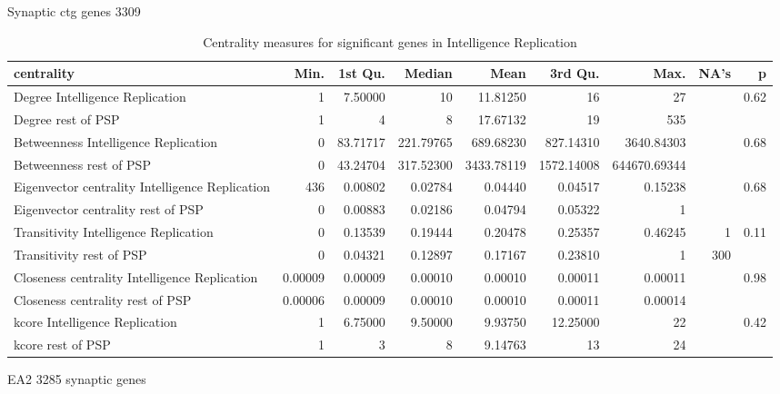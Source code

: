 Synaptic ctg genes  3309%
\begin{table}[ht]
\centering
\begin{adjustbox}{width=\textwidth}

\begin{tabular}{lrrrrrrrr}
  \hline
centrality & Min. & 1st Qu. & Median & Mean & 3rd Qu. & Max. & NA's & p \\ 
  \hline
Degree Intelligence Replication & 1  & 7.50000 & 10  & 11.81250 & 16  & 27  &  & 0.62 \\ 
  Degree rest of PSP & 1  & 4  & 8  & 17.67132 & 19  & 535  &  &  \\ 
  Betweenness Intelligence Replication & 0  & 83.71717 & 221.79765 & 689.68230 & 827.14310 & 3640.84303 &  & 0.68 \\ 
  Betweenness rest of PSP & 0  & 43.24704 & 317.52300 & 3433.78119 & 1572.14008 & 644670.69344 &  &  \\ 
  Eigenvector centrality Intelligence Replication &  436 & 0.00802 & 0.02784 & 0.04440 & 0.04517 & 0.15238 &  & 0.68 \\ 
  Eigenvector centrality rest of PSP & 0  & 0.00883 & 0.02186 & 0.04794 & 0.05322 & 1  &  &  \\ 
  Transitivity Intelligence Replication & 0  & 0.13539 & 0.19444 & 0.20478 & 0.25357 & 0.46245 & 1 & 0.11 \\ 
  Transitivity rest of PSP & 0  & 0.04321 & 0.12897 & 0.17167 & 0.23810 & 1  & 300 &  \\ 
  Closeness centrality Intelligence Replication & 0.00009 & 0.00009 & 0.00010 & 0.00010 & 0.00011 & 0.00011 &  & 0.98 \\ 
  Closeness centrality rest of PSP & 0.00006 & 0.00009 & 0.00010 & 0.00010 & 0.00011 & 0.00014 &  &  \\ 
  kcore Intelligence Replication & 1  & 6.75000 & 9.50000 & 9.93750 & 12.25000 & 22  &  & 0.42 \\ 
  kcore rest of PSP & 1  & 3  & 8  & 9.14763 & 13  & 24  &  &  \\ 
   \hline
\end{tabular}
\end{adjustbox}
\caption{Centrality measures for significant genes in Intelligence Replication} 
\label{tab:Centrality measures for significant genes in Intelligence Replication}
\end{table}

EA2 3285 synaptic genes

